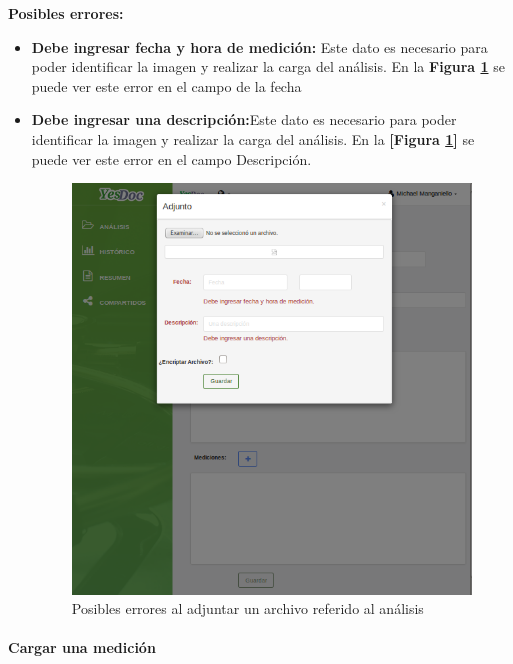  	\textbf{Posibles errores:}
 	\begin{itemize}
 		\item \textbf{Debe ingresar fecha y hora de medición:} Este dato es necesario para poder identificar la imagen y realizar la carga del análisis. En la \textbf{Figura \ref{mu-adjuntar_archivo_error}} se puede ver este error en el campo de la fecha
 		\item \textbf{Debe ingresar una descripción:}Este dato es necesario para poder identificar la imagen y realizar la carga del análisis. En la \textbf{[Figura \ref{mu-adjuntar_archivo_error}]} se puede ver este error en el campo Descripción.
 		
 		\begin{figure}
 			\centering
 			\includegraphics[width=.8\textwidth]{img/manual_de_usuario/mu-adjuntar_archivo_error}
 			\caption{Posibles errores al adjuntar un archivo referido al análisis}
 			\label{mu-adjuntar_archivo_error}	
 		\end{figure}
 		
 		
 	\end{itemize}
 	
 	
 		
\paragraph{Cargar una medición} 
 	
